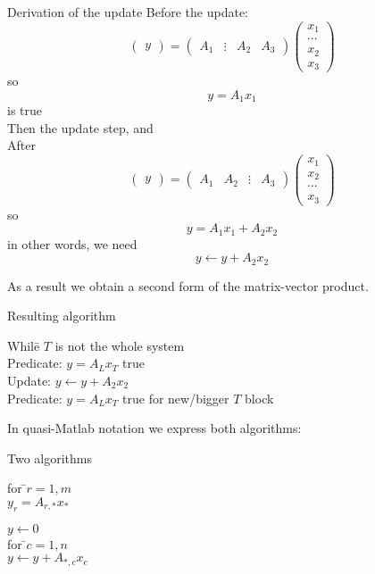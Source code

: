 \begin{block}{Derivation of the update}
  \small
  Before the update:
  \[
  \begin{pmatrix}
    y
  \end{pmatrix}
  =
  \begin{pmatrix}
    A_1 & \vdots & A_2 & A_3
  \end{pmatrix}
  \begin{pmatrix}
    x_1\\ \cdots \\ x_2 \\ x_3
  \end{pmatrix}
  \]
  so \[ y = A_1 x_1 \] is true\\
  Then the update step, and \\ After
  \[
  \begin{pmatrix}
    y
  \end{pmatrix}
  =
  \begin{pmatrix}
    A_1 & A_2  & \vdots & A_3
  \end{pmatrix}
  \begin{pmatrix}
    x_1 \\ x_2 \\ \cdots\\ x_3
  \end{pmatrix}
  \]
  so \[ y = A_1x_1 + A_2x_2 \]
  in other words, we need
  \[ y \leftarrow y+A_2x_2 \]
\end{block}

As a result we obtain a second form of the matrix-vector product.

\begin{block}{Resulting algorithm}
  \begin{tabbing}
    Whil\=e $T$ is not the whole system\\
    \> Predicate: $y = A_L x_T$ true\\
    \> Update: $y \leftarrow y + A_2x_2$ \\
    \> Predicate: $y = A_L x_T$ true for new/bigger $T$ block\\
  \end{tabbing}
\end{block}

In quasi-Matlab notation we express both algorithms:

\begin{block}{Two algorithms}
  \begin{multicols}{2}
    \begin{tabbing}
      for \=$r=1,m $\\
      \> $y_r = A_{r,*}x_* $\\
    \end{tabbing}
    \columnbreak
    \begin{tabbing}
      $y\leftarrow 0$\\
      for \=$c=1,n$\\
      \> $y\leftarrow y+A_{*,c}x_c$
    \end{tabbing}
  \end{multicols}
\end{block}


